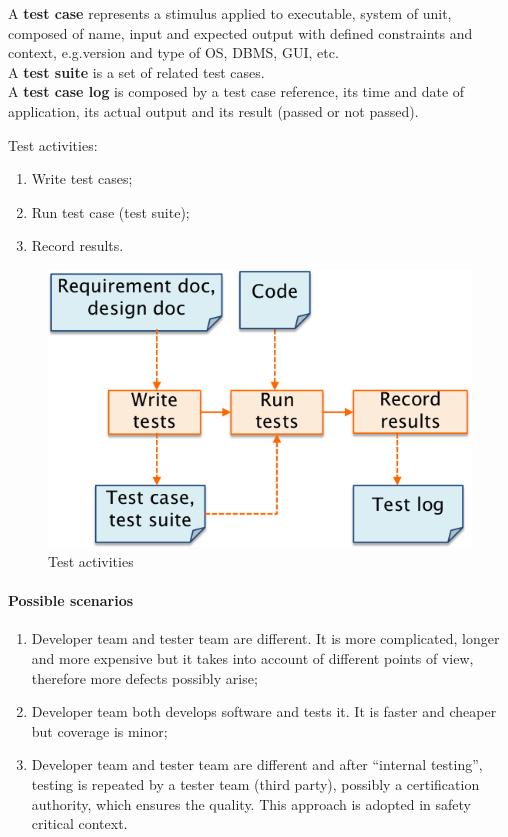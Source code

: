 A \textbf{test case} represents a stimulus applied to executable, system of unit, composed of name, input and expected output with defined constraints and context, e.g.\@ version and type of OS, DBMS, GUI, etc. \\
A \textbf{test suite} is a set of related test cases. \\
A \textbf{test case log} is composed by a test case reference, its time and date of application, its actual output and its result (passed or not passed).

Test activities:
\begin{enumerate}
\item Write test cases;
\item Run test case (test suite);
\item Record results.
\end{enumerate}

\begin{figure}[hbtp]
\centering
\includegraphics[scale=0.35]{images/test_activities.png}
\caption{Test activities}
\end{figure}

\paragraph{Possible scenarios}
\begin{enumerate}
\item Developer team and tester team are different. It is more complicated, longer and more expensive but it takes into account of different points of view, therefore more defects possibly arise;
\item Developer team both develops software and tests it. It is faster and cheaper but coverage is minor;
\item Developer team and tester team are different and after ``internal testing'', testing is repeated by a tester team (third party), possibly a certification authority, which ensures the quality. This approach is adopted in safety critical context.
\end{enumerate}

